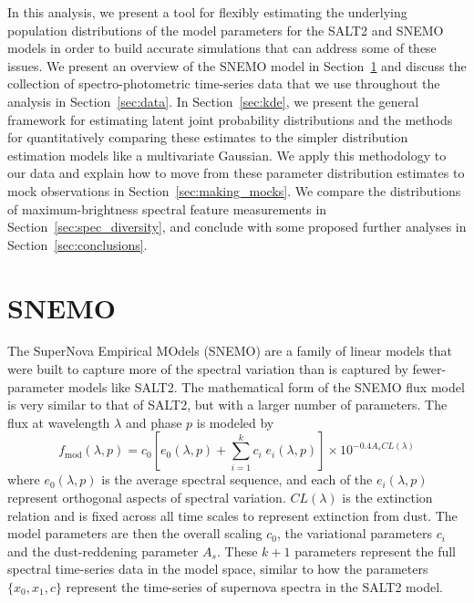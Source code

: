 In this analysis, we present a tool for flexibly estimating the underlying population distributions of the model parameters for the SALT2 and SNEMO models in order to build accurate simulations that can address some of these issues. We present an overview of the SNEMO model in Section~\ref{sec:snemo} and discuss the collection of spectro-photometric time-series data that we use throughout the analysis in Section~\ref{sec:data}. In Section~\ref{sec:kde}, we present the general framework for estimating latent joint probability distributions and the methods for quantitatively comparing these estimates to the simpler distribution estimation models like a multivariate Gaussian. We apply this methodology to our data and explain how to move from these parameter distribution estimates to mock observations in Section~\ref{sec:making_mocks}. We compare the distributions of maximum-brightness spectral feature measurements in Section~\ref{sec:spec_diversity}, and conclude with some proposed further analyses in Section~\ref{sec:conclusions}.

\section{SNEMO}
\label{sec:snemo}
The SuperNova Empirical MOdels (SNEMO) are a family of linear models that were built to capture more of the spectral variation than is captured by fewer-parameter models like SALT2. The mathematical form of the SNEMO flux model is very similar to that of SALT2, but with a larger number of parameters. The flux at wavelength $\lambda$ and phase $p$ is modeled by
\begin{equation}
    f_\text{mod}(\lambda, p) = c_0 \left[e_0(\lambda, p) + \displaystyle\sum_{i=1}^k c_i\;e_i(\lambda, p)\right] \times 10^{-0.4 A_s CL(\lambda)}
\label{eqn:snemo_flux_model}
\end{equation}
where $e_0(\lambda, p)$ is the average spectral sequence, and each of the $e_i(\lambda, p)$ represent orthogonal aspects of spectral variation. $CL(\lambda)$ is the \cite{fitzpatrick_correcting_1999} extinction relation and is fixed across all time scales to represent extinction from dust. The model parameters are then the overall scaling $c_0$, the variational parameters $c_i$ and the dust-reddening parameter $A_s$. These $k+1$ parameters represent the full spectral time-series data in the model space, similar to how the parameters $\{x_0, x_1, c\}$ represent the time-series of supernova spectra in the SALT2 model.

